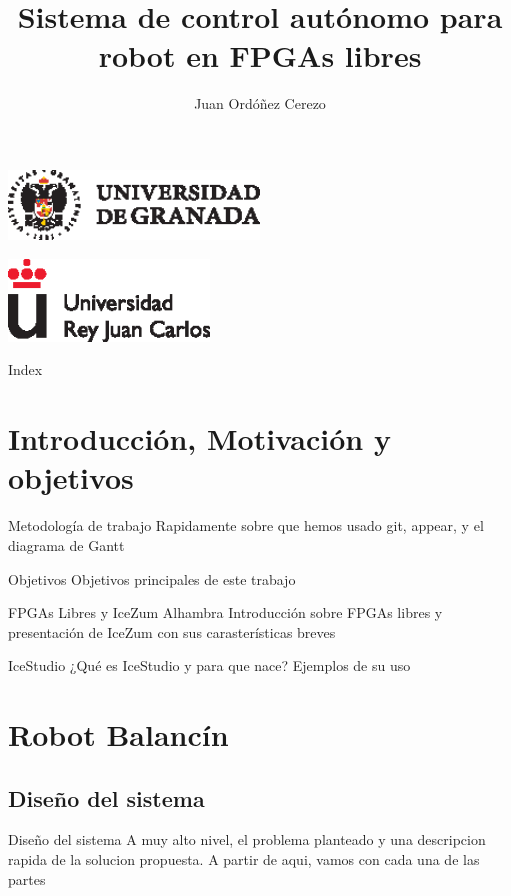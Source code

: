 \documentclass{beamer}
\title{Sistema de control autónomo para robot en FPGAs libres}
\subtitle{}
\author{Juan Ordóñez Cerezo\inst{1}}
\institute[Universidad de Granada] %
{
  \inst{1}%
  Universidad de Granada
}
\date{}
\begin{document}
\begin{frame}
  \begin{center}
  \includegraphics [width =0.5\textwidth ]{logo_ugr}
  \end{center}
    \begin{center}
	\includegraphics [width =0.4\textwidth ]{logo_rey}
	\end{center}
  \titlepage


\end{frame}

\begin{frame}{Index}
  \tableofcontents
\end{frame}

\section{Introducción, Motivación y objetivos}
\begin{frame}{Metodología de trabajo}
Rapidamente sobre que hemos usado git, appear, y el diagrama de Gantt
\end{frame}
\begin{frame}{Objetivos}
Objetivos principales de este trabajo
\end{frame}
\begin{frame}{FPGAs Libres y IceZum Alhambra}
Introducción sobre FPGAs libres y presentación de IceZum con sus carasterísticas breves
\end{frame}
\begin{frame}{IceStudio}
¿Qué es IceStudio y para que nace? Ejemplos de su uso
\end{frame}

\section{Robot Balancín}
\subsection{Diseño del sistema}
\begin{frame}{Diseño del sistema}
A muy alto nivel, el problema planteado y una descripcion rapida de la solucion propuesta. A partir de aqui, vamos con cada una de las partes
\end{frame}	
\end{document}
